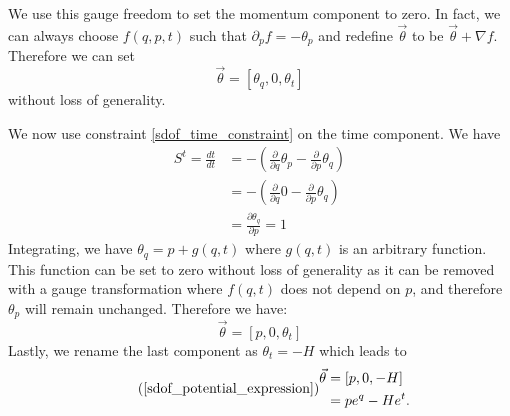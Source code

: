 \documentclass[10pt,twocolumn, nofootinbib]{revtex4-2}
\begin{document}
We use this gauge freedom to set the momentum component to zero. In fact, we can always choose $f(q,p,t)$ such that $\partial_p f = -\theta_p$ and redefine $\vec{\theta}$ to be $\vec{\theta} + \nabla f$. Therefore we can set
\begin{equation}
	\vec{\theta} = [\theta_q, 0, \theta_t]
\end{equation}
without loss of generality.

We now use constraint \ref{sdof_time_constraint} on the time component. We have
\begin{align}
	S^t = \frac{dt}{dt} &= - \left(\frac{\partial}{\partial q}  \theta_p - \frac{\partial}{\partial p}  \theta_q\right) \\
	&= - \left(\frac{\partial}{\partial q}  0 - \frac{\partial}{\partial p}  \theta_q\right) \\
	& = \frac{\partial \theta_q}{\partial p} = 1
\end{align}
Integrating, we have $\theta_q = p + g(q,t)$ where $g(q,t)$ is an arbitrary function. This function can be set to zero without loss of generality as it can be removed with a gauge transformation where $f(q,t)$ does not depend on $p$, and therefore $\theta_p$ will remain unchanged. Therefore we have:
\begin{equation}
	\vec{\theta} = [p, 0, \theta_t]
\end{equation}
Lastly, we rename the last component as $\theta_t = -H$ which leads to 
\begin{equation}
\tag*{(\ref{sdof_potential_expression})}
	\begin{aligned}
		\vec{\theta} &= [p, 0, -H] \\
		&= p e^q - H e^t.
	\end{aligned}
\end{equation}
\end{document}
